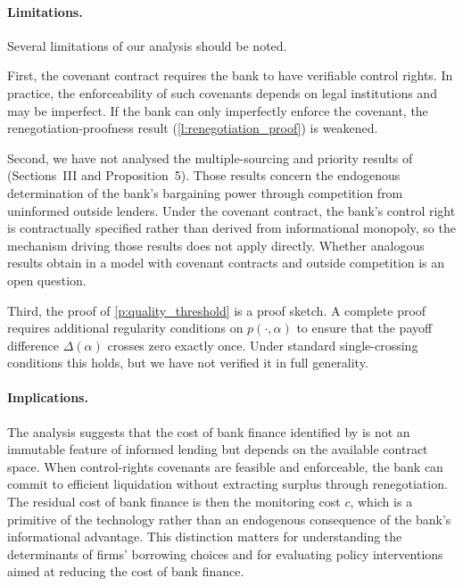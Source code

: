 \documentclass[12pt,a4paper]{article}
\theoremstyle{plain}
\theoremstyle{definition}
\theoremstyle{remark}
\begin{document}
\paragraph{Limitations.}
Several limitations of our analysis should be noted.

First, the covenant contract requires the bank to have verifiable control rights. In
practice, the enforceability of such covenants depends on legal institutions and may
be imperfect. If the bank can only imperfectly enforce the covenant, the
renegotiation-proofness result (\cref{l:renegotiation_proof}) is weakened.

Second, we have not analysed the multiple-sourcing and priority results of
\citet{Rajan1992} (Sections~III and Proposition~5). Those results concern the
endogenous determination of the bank's bargaining power through competition from
uninformed outside lenders. Under the covenant contract, the bank's control right is
contractually specified rather than derived from informational monopoly, so the
mechanism driving those results does not apply directly. Whether analogous results
obtain in a model with covenant contracts and outside competition is an open question.

Third, the proof of \cref{p:quality_threshold} is a proof sketch. A complete proof
requires additional regularity conditions on $p(\cdot, \alpha)$ to ensure that the
payoff difference $\Delta(\alpha)$ crosses zero exactly once. Under standard
single-crossing conditions this holds, but we have not verified it in full generality.

\paragraph{Implications.}
The analysis suggests that the cost of bank finance identified by \citet{Rajan1992}
is not an immutable feature of informed lending but depends on the available contract
space. When control-rights covenants are feasible and enforceable, the bank can commit
to efficient liquidation without extracting surplus through renegotiation. The
residual cost of bank finance is then the monitoring cost $c$, which is a primitive
of the technology rather than an endogenous consequence of the bank's informational
advantage. This distinction matters for understanding the determinants of firms'
borrowing choices and for evaluating policy interventions aimed at reducing the cost
of bank finance.
\end{document}
